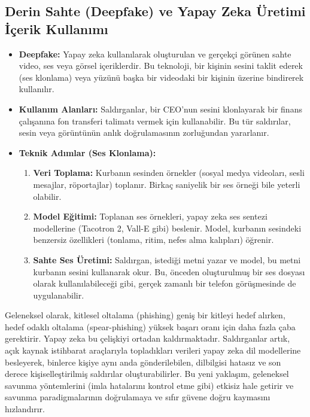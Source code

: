 \subsection{Derin Sahte (Deepfake) ve Yapay Zeka Üretimi İçerik Kullanımı}

\begin{itemize}
    \item \textbf{Deepfake:} Yapay zeka kullanılarak oluşturulan ve gerçekçi görünen sahte video, ses veya görsel içeriklerdir. Bu teknoloji, bir kişinin sesini taklit ederek (ses klonlama) veya yüzünü başka bir videodaki bir kişinin üzerine bindirerek kullanılır.
    \item \textbf{Kullanım Alanları:} Saldırganlar, bir CEO'nun sesini klonlayarak bir finans çalışanına fon transferi talimatı vermek için kullanabilir. Bu tür saldırılar, sesin veya görüntünün anlık doğrulamasının zorluğundan yararlanır.
    \item \textbf{Teknik Adımlar (Ses Klonlama):}
    \begin{enumerate}
        \item \textbf{Veri Toplama:} Kurbanın sesinden örnekler (sosyal medya videoları, sesli mesajlar, röportajlar) toplanır. Birkaç saniyelik bir ses örneği bile yeterli olabilir.
        \item \textbf{Model Eğitimi:} Toplanan ses örnekleri, yapay zeka ses sentezi modellerine (Tacotron 2, Vall-E gibi) beslenir. Model, kurbanın sesindeki benzersiz özellikleri (tonlama, ritim, nefes alma kalıpları) öğrenir.
        \item \textbf{Sahte Ses Üretimi:} Saldırgan, istediği metni yazar ve model, bu metni kurbanın sesini kullanarak okur. Bu, önceden oluşturulmuş bir ses dosyası olarak kullanılabileceği gibi, gerçek zamanlı bir telefon görüşmesinde de uygulanabilir.
    \end{enumerate}
\end{itemize}

Geleneksel olarak, kitlesel oltalama (phishing) geniş bir kitleyi hedef alırken, hedef odaklı oltalama (spear-phishing) yüksek başarı oranı için daha fazla çaba gerektirir. Yapay zeka bu çelişkiyi ortadan kaldırmaktadır. Saldırganlar artık, açık kaynak istihbarat araçlarıyla topladıkları verileri yapay zeka dil modellerine besleyerek, binlerce kişiye aynı anda gönderilebilen, dilbilgisi hatasız ve son derece kişiselleştirilmiş saldırılar oluşturabilirler. Bu yeni yaklaşım, geleneksel savunma yöntemlerini (imla hatalarını kontrol etme gibi) etkisiz hale getirir ve savunma paradigmalarının doğrulamaya ve sıfır güvene doğru kaymasını hızlandırır.

